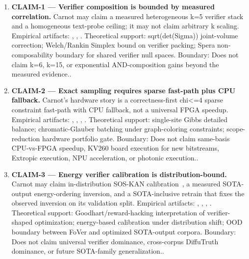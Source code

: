 \documentclass[10pt]{article}
\begin{document}
\begin{enumerate}
  \item \textbf{CLAIM-1 --- Verifier composition is bounded by measured correlation.} Carnot may claim a measured heterogeneous k=5 verifier stack and a homogeneous text-probe ceiling; it may not claim arbitrary k scaling.
  Empirical artifacts: , , .
  Theoretical support: sqrt(det(Sigma)) joint-volume correction; Welch/Rankin Simplex bound on verifier packing; Spera non-composability boundary for shared verifier null spaces.
  Boundary: Does not claim k=6, k=15, or exponential AND-composition gains beyond the measured evidence..
  \item \textbf{CLAIM-2 --- Exact sampling requires sparse fast-path plus CPU fallback.} Carnot's hardware story is a correctness-first chi<=4 sparse constraint fast-path with CPU fallback, not a universal FPGA speedup.
  Empirical artifacts: , , , .
  Theoretical support: single-site Gibbs detailed balance; chromatic-Glauber batching under graph-coloring constraints; scope-reduction hardware portfolio gate.
  Boundary: Does not claim same-basis CPU-vs-FPGA speedup, KV260 board execution for new bitstreams, Extropic execution, NPU acceleration, or photonic execution..
  \item \textbf{CLAIM-3 --- Energy verifier calibration is distribution-bound.} Carnot may claim in-distribution SOS-KAN calibration~\cite{diff_conformal_2026}, a measured SOTA-output energy-ordering inversion, and a SOTA-inclusive retrain that fixes the observed inversion on its validation split.
  Empirical artifacts: , , , .
  Theoretical support: Goodhart/reward-hacking interpretation of verifier-shaped optimization; energy-based calibration under distribution shift; OOD boundary between FoVer and optimized SOTA-output corpora.
  Boundary: Does not claim universal verifier dominance, cross-corpus DiffuTruth dominance, or future SOTA-family generalization..

\end{enumerate}
\end{document}
